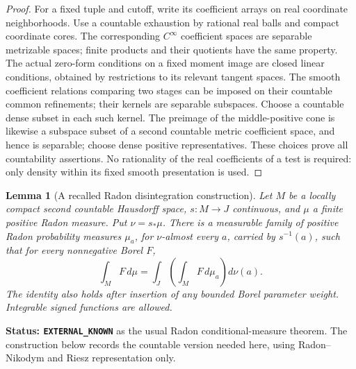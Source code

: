 \documentclass[11pt,a4paper]{article}
\numberwithin{equation}{section}
\newtheorem{lemma}[theorem]{Lemma}
\theoremstyle{definition}
\theoremstyle{remark}
\begin{document}
\begin{proof}
For a fixed tuple and cutoff, write its coefficient arrays on
real coordinate neighborhoods. Use a countable exhaustion by
rational real balls and compact coordinate cores. The corresponding
$C^\infty$ coefficient spaces are separable metrizable spaces;
finite products and their quotients have the same property. The
actual zero-form conditions on a fixed moment image are closed
linear conditions, obtained by restrictions to its relevant tangent
spaces. The smooth coefficient relations comparing two stages can
be imposed on their countable common refinements; their kernels
are separable subspaces. Choose a countable dense subset in each
such kernel. The preimage of the middle-positive cone is likewise
a subspace subset of a second countable metric coefficient space,
and hence is separable; choose dense positive representatives.
These choices prove all countability assertions. No rationality of
the real coefficients of a test is required: only density within
its fixed smooth presentation is used.
\end{proof}

\begin{lemma}[A recalled Radon disintegration construction]
\label{lem:r12-Radon-conditional-measures}
Let $M$ be a locally compact second countable Hausdorff space,
$s:M\to J$ continuous, and $\mu$ a finite positive Radon measure.
Put $\nu=s_*\mu$. There is a measurable family of positive Radon
probability measures $\mu_a$, for $\nu$-almost every $a$, carried
by $s^{-1}(a)$, such that for every nonnegative Borel $F$,
\[
                       \int_M F\,d\mu
                          =\int_J\left(\int_M F\,d\mu_a\right)d\nu(a).
 \tag{DI2}
\]
The identity also holds after insertion of any bounded Borel
parameter weight. Integrable signed functions are allowed.
\end{lemma}

\noindent\textbf{Status: \texttt{EXTERNAL\_KNOWN}} as the usual
Radon conditional-measure theorem. The construction below records
the countable version needed here, using Radon--Nikodym and Riesz
representation only.
\end{document}
